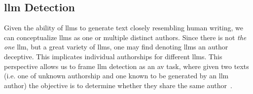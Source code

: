 



\subsection{\acs{llm} Detection}
Given the ability of \acp{llm} to generate text closely resembling human writing, we can conceptualize \acp{llm} as one or multiple distinct authors.
Since there is not \textit{the one} \ac{llm}, but a great variety of \acp{llm}, one may find denoting \acp{llm} an author deceptive.
This implicates individual authorships for different \acp{llm}.
This perspective allows us to frame \ac{llm} detection as an \ac{av} task, where given two texts (i.e. one of unknown authorship and one known to be generated by an \ac{llm} author) the objective is to determine whether they share the same author~\citep{llm_detection_av_2025}.



